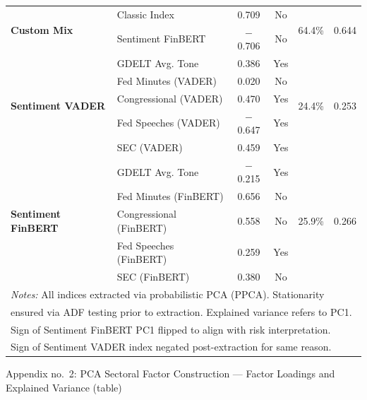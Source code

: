 \documentclass[12pt,a4paper]{report}
\begin{document}
\begin{table}[H]
{\begin{tabular}{ll cc cc}
\multirow{2}{*}{\textbf{Custom Mix}}
 & Classic Index           &  0.709 & No & \multirow{2}{*}{64.4\%} & \multirow{2}{*}{0.644} \\
 & Sentiment FinBERT       & $-$0.706 & No & & \\
\midrule

\multirow{5}{*}{\textbf{Sentiment VADER}}
 & GDELT Avg. Tone          &  0.386 & Yes & \multirow{5}{*}{24.4\%} & \multirow{5}{*}{0.253} \\
 & Fed Minutes (VADER)      &  0.020 & No  & & \\
 & Congressional (VADER)    &  0.470 & Yes & & \\
 & Fed Speeches (VADER)     & $-$0.647 & Yes & & \\
 & SEC (VADER)              &  0.459 & Yes & & \\
\midrule

\multirow{5}{*}{\textbf{Sentiment FinBERT}}
 & GDELT Avg. Tone            & $-$0.215 & Yes & \multirow{5}{*}{25.9\%} & \multirow{5}{*}{0.266} \\
 & Fed Minutes (FinBERT)      &  0.656 & No  & & \\
 & Congressional (FinBERT)    &  0.558 & No  & & \\
 & Fed Speeches (FinBERT)     &  0.259 & Yes & & \\
 & SEC (FinBERT)              &  0.380 & No  & & \\
\bottomrule
\multicolumn{6}{l}{\footnotesize \textit{Notes:} All indices extracted via probabilistic PCA (PPCA). Stationarity}\\
\multicolumn{6}{l}{\footnotesize ensured via ADF testing prior to extraction. Explained variance refers to PC1.}\\
\multicolumn{6}{l}{\footnotesize Sign of Sentiment FinBERT PC1 flipped to align with risk interpretation.}\\
\multicolumn{6}{l}{\footnotesize Sign of Sentiment VADER index negated post-extraction for same reason.}\\
\end{tabular}%
}
\end{table} 

\noindent Appendix no.\ 2: PCA Sectoral Factor Construction --- Factor Loadings and Explained Variance (table)
\end{document}
